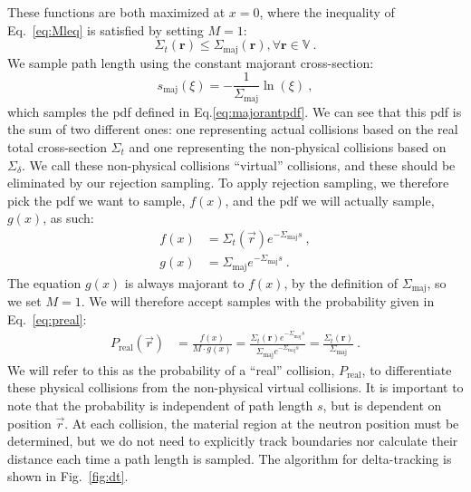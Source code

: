 These functions are both maximized at $x=0$, where the inequality of
Eq.~\eqref{eq:Mleq} is satisfied by setting $M=1$:
\begin{equation}
  \label{eq:cseq}
  \Sigma_t(\mathbf{r}) \leq \Sigma_\mathrm{maj}(\mathbf{r}), \forall
  \mathbf{r} \in \mathbb{V} \:.
\end{equation}
We sample path length using the constant majorant
cross-section:
\begin{equation}
  \label{eq:majorantsample}
  s_\mathrm{maj}(\xi) = -\frac{1}{\Sigma_\mathrm{maj}}\ln(\xi)\:,
\end{equation}
which samples the \gls{pdf} defined in Eq.\eqref{eq:majorantpdf}.
We can see that this \gls{pdf} is the sum of two different ones: one
representing actual collisions based on the real total cross-section
$\Sigma_t$ and one representing the non-physical collisions based on
$\Sigma_\delta$. We call these non-physical collisions ``virtual''
collisions, and these should be eliminated by our rejection
sampling. To apply rejection sampling, we therefore pick the \gls{pdf}
we want to sample, $f(x)$, and the \gls{pdf} we will actually sample,
$g(x)$, as such:
\begin{align*}
  f(x) &= \Sigma_t(\vec{r})e^{-\Sigma_\mathrm{maj}s} \:,\\
  g(x) &= \Sigma_\mathrm{maj}e^{-\Sigma_\mathrm{maj}s}\:.
\end{align*}
The equation $g(x)$ is always majorant to $f(x)$, by the definition of
$\Sigma_{\mathrm{maj}}$, so we set $M=1$. We will therefore accept samples with the
probability given in Eq.~\eqref{eq:preal}:
\begin{align}
  \label{eq:prealfinal}
  P_{\mathrm{real}}(\vec{r}) &= \frac{f(x)}{M \cdot g(x)} =
      \frac{\Sigma_t(\mathbf{r})e^{-\Sigma_\mathrm{maj}s}}{\Sigma_\mathrm{maj}e^{-\Sigma_\mathrm{maj}s}}
  = \frac{\Sigma_t(\mathbf{r})}{\Sigma_\mathrm{maj}}\:.
\end{align}
We will refer to this as the probability of a ``real'' collision,
$P_\mathrm{real}$, to differentiate these physical collisions from the
non-physical virtual collisions. It is important to note that the
probability is independent of path length $s$, but is dependent on
position $\vec{r}$. At each collision, the material region at the
neutron position must be determined, but we do not need to explicitly
track boundaries nor calculate their distance each time a path length
is sampled. The algorithm for delta-tracking is shown in
Fig.~\ref{fig:dt}.

